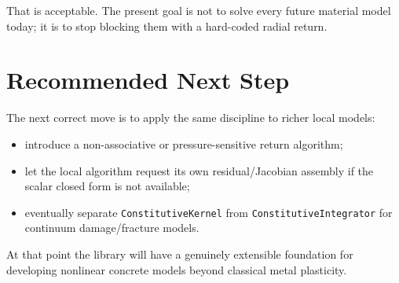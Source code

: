 That is acceptable.  The present goal is not to solve every future material
model today; it is to stop blocking them with a hard-coded radial return.

\section{Recommended Next Step}

The next correct move is to apply the same discipline to richer local models:

\begin{itemize}
  \item introduce a non-associative or pressure-sensitive return algorithm;
  \item let the local algorithm request its own residual/Jacobian assembly if
        the scalar closed form is not available;
  \item eventually separate \texttt{ConstitutiveKernel} from
        \texttt{ConstitutiveIntegrator} for continuum damage/fracture models.
\end{itemize}

At that point the library will have a genuinely extensible foundation for
developing nonlinear concrete models beyond classical metal plasticity.
